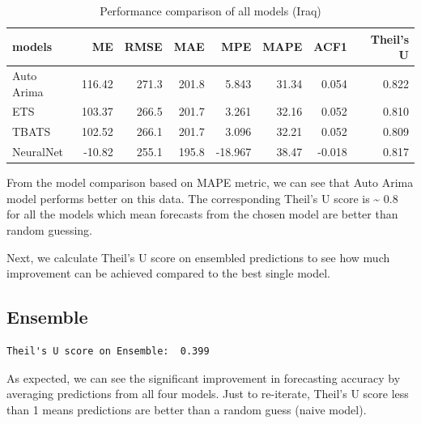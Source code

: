 \documentclass[11pt,oneside,a4paper]{reedthesis}
\newenvironment{Shaded}{\begin{snugshade}}{\end{snugshade}}
\newcommand{\KeywordTok}[1]{\textcolor[rgb]{0.13,0.29,0.53}{\textbf{#1}}}
\newcommand{\DataTypeTok}[1]{\textcolor[rgb]{0.13,0.29,0.53}{#1}}
\newcommand{\DecValTok}[1]{\textcolor[rgb]{0.00,0.00,0.81}{#1}}
\newcommand{\StringTok}[1]{\textcolor[rgb]{0.31,0.60,0.02}{#1}}
\newcommand{\CommentTok}[1]{\textcolor[rgb]{0.56,0.35,0.01}{\textit{#1}}}
\newcommand{\OperatorTok}[1]{\textcolor[rgb]{0.81,0.36,0.00}{\textbf{#1}}}
\newcommand{\NormalTok}[1]{#1}
\begin{document}
\begin{table}[H]

\caption{\label{tab:unnamed-chunk-90}Performance comparison of all models (Iraq)}
\centering
\fontsize{12}{14}\selectfont
\begin{tabular}[t]{lrrrrrrr}
\toprule
models & ME & RMSE & MAE & MPE & MAPE & ACF1 & Theil's U\\
\midrule
Auto Arima & 116.42 & 271.3 & 201.8 & 5.843 & 31.34 & 0.054 & 0.822\\
ETS & 103.37 & 266.5 & 201.7 & 3.261 & 32.16 & 0.052 & 0.810\\
TBATS & 102.52 & 266.1 & 201.7 & 3.096 & 32.21 & 0.052 & 0.809\\
NeuralNet & -10.82 & 255.1 & 195.8 & -18.967 & 38.47 & -0.018 & 0.817\\
\bottomrule
\end{tabular}
\end{table}
From the model comparison based on MAPE metric, we can see that Auto
Arima model performs better on this data. The corresponding Theil's U
score is \textasciitilde{} 0.8 for all the models which mean forecasts
from the chosen model are better than random guessing.

Next, we calculate Theil's U score on ensembled predictions to see how
much improvement can be achieved compared to the best single model.

\subsection{Ensemble}\label{ensemble-1}
\begin{Shaded}
\end{Shaded}
\begin{verbatim}
Theil's U score on Ensemble:  0.399
\end{verbatim}
As expected, we can see the significant improvement in forecasting
accuracy by averaging predictions from all four models. Just to
re-iterate, Theil's U score less than 1 means predictions are better
than a random guess (naive model).
\end{document}
